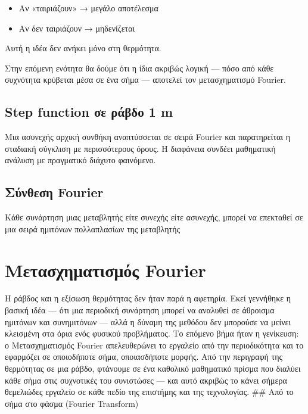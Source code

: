 \documentclass[a4paper, 11pt]{article}
\providecommand{\tightlist}{\setlength{\itemsep}{0pt}\setlength{\parskip}{0pt}}
\begin{document}
\begin{itemize}
\tightlist
\item
  Αν «ταιριάζουν» → μεγάλο αποτέλεσμα
\item
  Αν δεν ταιριάζουν → μηδενίζεται
\end{itemize}

Αυτή η ιδέα δεν ανήκει μόνο στη θερμότητα.

Στην επόμενη ενότητα θα δούμε ότι η ίδια ακριβώς λογική --- πόσο από
κάθε συχνότητα κρύβεται μέσα σε ένα σήμα --- αποτελεί τον μετασχηματισμό
Fourier.

\subsection{Step function σε ράβδο 1
m}\label{step-function-ux3c3ux3b5-ux3c1ux3acux3b2ux3b4ux3bf-1-m}

Μια ασυνεχής αρχική συνθήκη αναπτύσσεται σε σειρά Fourier και
παρατηρείται η σταδιακή σύγκλιση με περισσότερους όρους. Η διαφάνεια
συνδέει μαθηματική ανάλυση με πραγματικό διάχυτο φαινόμενο.

\subsection{Σύνθεση
Fourier}\label{ux3c3ux3cdux3bdux3b8ux3b5ux3c3ux3b7-fourier}

Κάθε συνάρτηση μιας μεταβλητής είτε συνεχής είτε ασυνεχής, μπορεί να
επεκταθεί σε μια σειρά ημιτόνων πολλαπλασίων της μεταβλητής

\section{Μετασχηματισμός
Fourier}\label{ux3bcux3b5ux3c4ux3b1ux3c3ux3c7ux3b7ux3bcux3b1ux3c4ux3b9ux3c3ux3bcux3ccux3c2-fourier}

Η ράβδος και η εξίσωση θερμότητας δεν ήταν παρά η αφετηρία. Εκεί
γεννήθηκε η βασική ιδέα --- ότι μια περιοδική συνάρτηση μπορεί να
αναλυθεί σε άθροισμα ημιτόνων και συνημιτόνων --- αλλά η δύναμη της
μεθόδου δεν μπορούσε να μείνει κλεισμένη στα όρια ενός φυσικού
προβλήματος. Το επόμενο βήμα ήταν η γενίκευση: ο Μετασχηματισμός Fourier
απελευθερώνει το εργαλείο από την περιοδικότητα και το εφαρμόζει σε
οποιοδήποτε σήμα, οποιασδήποτε μορφής. Από την περιγραφή της θερμότητας
σε μια ράβδο, φτάνουμε σε ένα καθολικό μαθηματικό πρίσμα που διαλύει
κάθε σήμα στις συχνοτικές του συνιστώσες --- και αυτό ακριβώς το κάνει
σήμερα θεμελιώδες εργαλείο σε κάθε πεδίο της επιστήμης και της
τεχνολογίας. \#\# Από το σήμα στο φάσμα (Fourier Transform)
\end{document}
